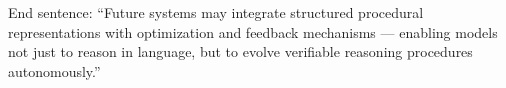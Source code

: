 \documentclass[project]{bsu-cs}  %
\begin{document}
End sentence: “Future systems may integrate structured procedural representations with optimization and feedback mechanisms — enabling models not just to reason in language, but to evolve verifiable reasoning procedures autonomously.”
% 
\backmatter
%
%


%
%
\appendix
\finish  %
\end{document}
